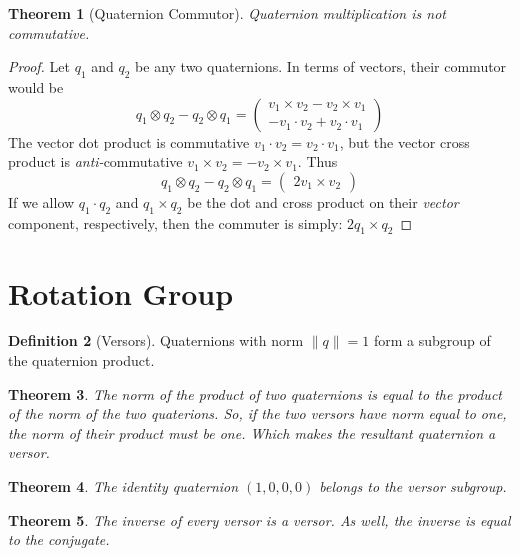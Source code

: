 \documentclass{amsart}
\newtheorem{theorem}{Theorem}[section]
\theoremstyle{definition}
\newtheorem{definition}[theorem]{Definition}
\theoremstyle{remark}
\numberwithin{equation}{section}
\begin{document}
\begin{theorem}[Quaternion Commutor]
  Quaternion multiplication is not commutative.
\end{theorem}
\begin{proof}
  Let $q_1$ and $q_2$ be any two quaternions. In terms of vectors, their commutor would be
  \begin{equation}
    q_1\otimes q_2-q_2\otimes q_1
    =
    \begin{pmatrix}
      v_1 \times v_2 - v_2 \times v_1 \\
      -v_1\cdot v_2 +v_2\cdot v_1
    \end{pmatrix}
  \end{equation}
  The vector dot product is commutative $v_1\cdot v_2 = v_2\cdot v_1$, but the vector cross product is \emph{anti-}commutative $v_1\times v_2 = -v_2 \times v_1$. Thus
  \begin{equation}
    q_1\otimes q_2-q_2\otimes q_1 =
    \begin{pmatrix}
      2v_1\times v_2
    \end{pmatrix}
  \end{equation}
  If we allow $q_1\cdot q_2$ and $q_1\times q_2$ be the dot and cross product on their \emph{vector} component, respectively, then the commuter is simply: $2q_1\times q_2$
\end{proof}


\section{Rotation Group}


\begin{definition}[Versors]
  Quaternions with norm $\|q\|=1$ form a subgroup of the quaternion product.
\end{definition}

\begin{theorem}
  The norm of the product of two quaternions is equal to the product of the norm of the two quaterions. So, if the two versors have norm equal to one, the norm of their product must be one. Which makes the resultant quaternion a versor.
\end{theorem}

\begin{theorem}
  The identity quaternion $(1, 0, 0, 0)$ belongs to the versor subgroup.
\end{theorem}

\begin{theorem}
  The inverse of every versor is a versor. As well, the inverse is equal to the conjugate.
\end{theorem}
\end{document}
